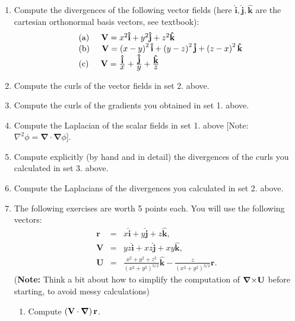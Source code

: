 \documentclass[fleqn]{article}
\newcommand{\grad}[1]{\mbox{\boldmath $\nabla$}\mbox{$#1$}}
\begin{document}
\begin{enumerate}
    \item \label{ex.b} Compute the divergences of the following vector fields (here $\mathbf{\hat{i}},\mathbf{\hat{j}},\mathbf{\hat{k}}$ are the cartesian orthonormal basis vectors, see textbook): 
    \[
    \begin{array}{lll}
     & {\rm (a)\hspace{0.2in}}\mathbf{V}=x^{2}\mathbf{\hat{i}}+y^{2}\mathbf{\hat{j}}+z^{2}\mathbf{\hat{k}} \\ 
     & {\rm (b)\hspace{0.2in}}\mathbf{V}=\left(x-y\right) ^{2}\mathbf{\hat{i}}+\left( y-z\right) ^{2}\mathbf{\hat{j}}+\left( z-x\right) ^{2}\mathbf{\hat{k}} \\ 
    
     & {\rm (c)\hspace{0.2in}}\mathbf{V}=\frac{\textstyle \mathbf{\hat{i}}}{\textstyle x}+\frac{\textstyle \mathbf{\hat{j}}}{\textstyle y}+\frac{\textstyle \mathbf{\hat{k}}}{\textstyle z}
    \end{array}
    \]
    
    \item Compute the curls of the vector fields in set 2. above.
    
    \item Compute the curls of the gradients you obtained in set 1. above.
    
    \item Compute the Laplacian of the scalar fields in set 1. above [Note: $\nabla ^{2}\phi =\mathbf{\nabla \cdot \nabla }\phi $].
    
    \item Compute explicitly (by hand and in detail) the divergences of the curls you calculated in set 3. above.   
    
    \item Compute the Laplacians of the divergences you calculated in set 2. above.
    
    
    \item The following exercises are worth 5 points each. You will use the following vectors: 
      \begin{eqnarray*}
      \mathbf{r} &=&x\mathbf{\hat{i}}+y\mathbf{\hat{j}}+z\mathbf{\hat{k},} \\
      \mathbf{V} &=&yz\mathbf{\hat{i}}+xz\mathbf{\hat{j}}+xy\mathbf{\hat{k},} \\
      \mathbf{U} &=&\frac{x^{2}+y^{2}+z^{2}}{\left( x^{2}+y^{2}\right) ^{3/2}}
      \mathbf{\hat{k}-}\frac{z}{\left( x^{2}+y^{2}\right) ^{3/2}}\mathbf{r.}
      \end{eqnarray*}
    ({\bf Note:} Think a bit about how to simplify the computation of
    $\mathbf{\grad \times U}$ before starting, to avoid messy calculations)
    \begin{enumerate}
    \item Compute $\left( \mathbf{V\cdot \grad{}}\right) \mathbf{r}$.
    

\end{enumerate}
\end{enumerate}
\end{document}
